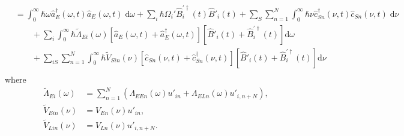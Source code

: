 \documentclass{article}
\begin{document}
\begin{equation}
\begin{split}
&= \int_0^\infty\hbar\omega\hat{a}_E^\dagger(\omega,t)\hat{a}_E(\omega,t)\;\mathrm{d}\omega + \sum_i\hbar\Omega_i'\hat{B}_i^{\prime\dagger}(t)\hat{B}'_i(t) + \sum_{S}\sum_{n = 1}^N\int_0^\infty\hbar\nu\hat{c}_{Sn}^\dagger(\nu,t)\hat{c}_{Sn}(\nu,t)\;\mathrm{d}\nu\\
&\qquad + \sum_i\int_0^\infty\hbar\tilde{\Lambda}_{Ei}(\omega)\left[\hat{a}_E(\omega,t) + \hat{a}_E^\dagger(\omega,t)\right]\left[\hat{B}'_i(t) + \hat{B}_i^{\prime\dagger}(t)\right]\mathrm{d}\omega\\
&\qquad + \sum_{iS}\sum_{n = 1}^{N}\int_0^\infty\hbar\tilde{V}_{Sin}(\nu)\left[\hat{c}_{Sn}(\nu,t) + \hat{c}_{Sn}^\dagger(\nu,t)\right]\left[\hat{B}'_i(t) + \hat{B}_i^{\prime\dagger}(t)\right]\mathrm{d}\nu\\
\end{split}
\end{equation}
where
\begin{equation}
\begin{split}
\tilde{\Lambda}_{Ei}(\omega) 
&= \sum_{n = 1}^N\left(\Lambda_{EEn}(\omega)u'_{in} + \Lambda_{ELn}(\omega)u'_{i,n+N}\right),\\
\tilde{V}_{Ein}(\nu) &= V_{En}(\nu)u'_{in},\\
\tilde{V}_{Lin}(\nu) &= V_{Ln}(\nu)u'_{i,n + N}.
\end{split}
\end{equation}
\end{document}
